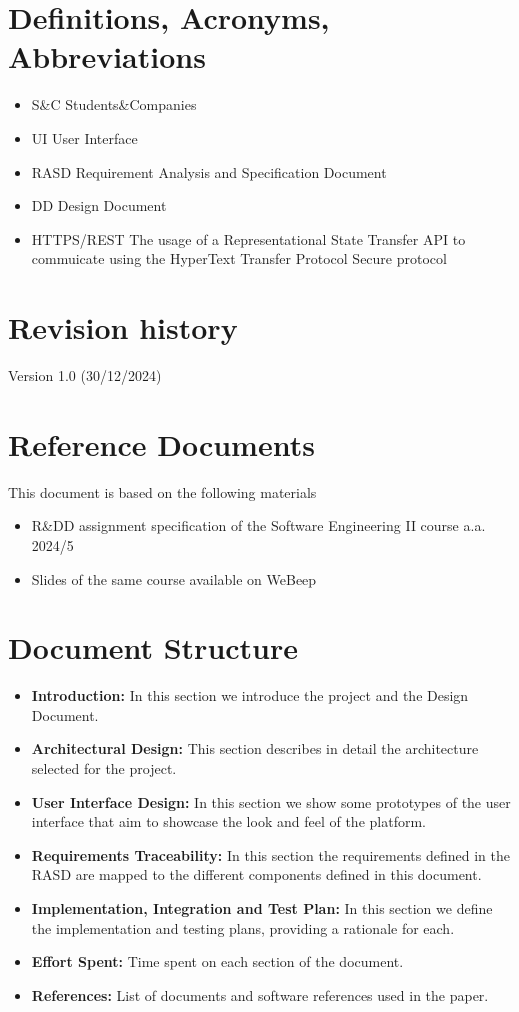 \section{Definitions, Acronyms, Abbreviations}
\begin{itemize}
    \item S\&C Students\&Companies
    \item UI User Interface
    \item RASD Requirement Analysis and Specification Document
    \item DD Design Document
    \item HTTPS/REST The usage of a Representational State Transfer API to commuicate using the HyperText Transfer Protocol Secure protocol
\end{itemize}
\section{Revision history}
Version 1.0 (30/12/2024)
\section{Reference Documents}
This document is based on the following materials
\begin{itemize}
    \item R\&DD assignment specification of the Software Engineering II course a.a. 2024/5
    \item Slides of the same course available on WeBeep
\end{itemize}
\section{Document Structure}
\begin{itemize}
  \item \textbf{Introduction:} In this section we introduce the project and the Design Document.
  \item \textbf{Architectural Design:} This section describes in detail the architecture selected for the project.
  \item \textbf{User Interface Design:} In this section we show some prototypes of the user interface that aim to showcase the look and feel of the platform.
  \item \textbf{ Requirements Traceability:} In this section the requirements defined in the RASD are mapped to the different components defined in this document.
  \item \textbf{Implementation, Integration and Test Plan:} In this section we define the implementation and testing plans, providing a rationale for each.
  \item \textbf{Effort Spent:} Time spent on each section of the document.
  \item \textbf{References:} List of documents and software references used in the paper.
  \end{itemize}

